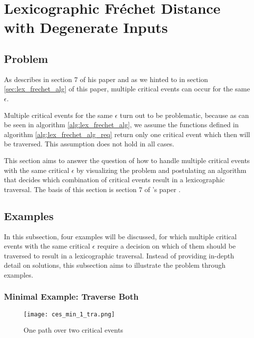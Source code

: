 
\section{Lexicographic Fréchet Distance with Degenerate Inputs}\label{lex_frechet_deg}

\subsection{Problem}

As \citeauthor{rotelex} describes in section 7 of his paper  and as we hinted to in section \ref{sec:lex_frechet_alg} of this paper, multiple critical events can occur for the same $\epsilon$.

Multiple critical events for the same $\epsilon$ turn out to be problematic, because as can be seen in algorithm \ref{alg:lex_frechet_alg}, we assume the functions defined in algorithm \ref{alg:lex_frechet_alg_req} return only one critical event which then will be traversed. This assumption does not hold in all cases.

This section aims to answer the question of how to handle multiple critical events with the same critical $\epsilon$ by visualizing the problem and postulating an algorithm that decides which combination of critical events result in a lexicographic traversal. The basis of this section is section 7 of \citeauthor{rotelex}'s paper \cite{rotelex}.


\subsection{Examples}

In this subsection, four examples will be discussed, for which multiple critical events with the same critical $\epsilon$ require a decision on which of them should be traversed to result in a lexicographic traversal. Instead of providing in-depth detail on solutions, this subsection aims to illustrate the problem through examples.


\subsubsection{Minimal Example: Traverse Both}\label{sec:ces_min_1}

\begin{figure}[H]
    \centering
    
    \texttt{[image: ces\_min\_1\_tra.png]}
		
	\caption{One path over two critical events}
    \label{fig:ces_min_1}
\end{figure}

